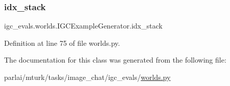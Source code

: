 \subsubsection{\texorpdfstring{idx\+\_\+stack}{idx\_stack}}
{\footnotesize\ttfamily igc\+\_\+evals.\+worlds.\+I\+G\+C\+Example\+Generator.\+idx\+\_\+stack}



Definition at line 75 of file worlds.\+py.



The documentation for this class was generated from the following file\+:\begin{DoxyCompactItemize}
\item 
parlai/mturk/tasks/image\+\_\+chat/igc\+\_\+evals/\hyperlink{parlai_2mturk_2tasks_2image__chat_2igc__evals_2worlds_8py}{worlds.\+py}\end{DoxyCompactItemize}
